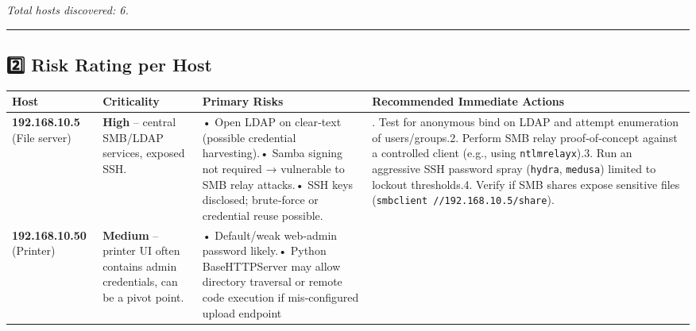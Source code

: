 \emph{Total hosts discovered: 6.}

\begin{center}\rule{0.5\linewidth}{0.5pt}\end{center}

\subsection{2️⃣ Risk Rating per Host}\label{risk-rating-per-host}

\begin{longtable}[]{@{}
  >{\raggedright\arraybackslash}p{}
  >{\raggedright\arraybackslash}p{}
  >{\raggedright\arraybackslash}p{}
  >{\raggedright\arraybackslash}p{}@{}}
\toprule\noalign{}
\begin{minipage}[b]{\linewidth}\raggedright
Host
\end{minipage} & \begin{minipage}[b]{\linewidth}\raggedright
Criticality
\end{minipage} & \begin{minipage}[b]{\linewidth}\raggedright
Primary Risks
\end{minipage} & \begin{minipage}[b]{\linewidth}\raggedright
Recommended Immediate Actions
\end{minipage} \\
\midrule\noalign{}
\endhead
\bottomrule\noalign{}
\endlastfoot
\textbf{192.168.10.5} (File server) & \textbf{High} -- central SMB/LDAP
services, exposed SSH. & • Open LDAP on clear‑text (possible credential
harvesting).• Samba signing not required → vulnerable to SMB relay
attacks.• SSH keys disclosed; brute‑force or credential reuse possible.
& 1. Test for anonymous bind on LDAP and attempt enumeration of
users/groups.2. Perform SMB relay proof‑of‑concept against a controlled
client (e.g., using \texttt{ntlmrelayx}).3. Run an aggressive SSH
password spray (\texttt{hydra}, \texttt{medusa}) limited to lockout
thresholds.4. Verify if SMB shares expose sensitive files
(\texttt{smbclient\ //192.168.10.5/share}). \\
\textbf{192.168.10.50} (Printer) & \textbf{Medium} -- printer UI often
contains admin credentials, can be a pivot point. & • Default/weak
web‑admin password likely.• Python BaseHTTPServer may allow directory
traversal or remote code execution if mis‑configured upload endpoint

\end{longtable}
